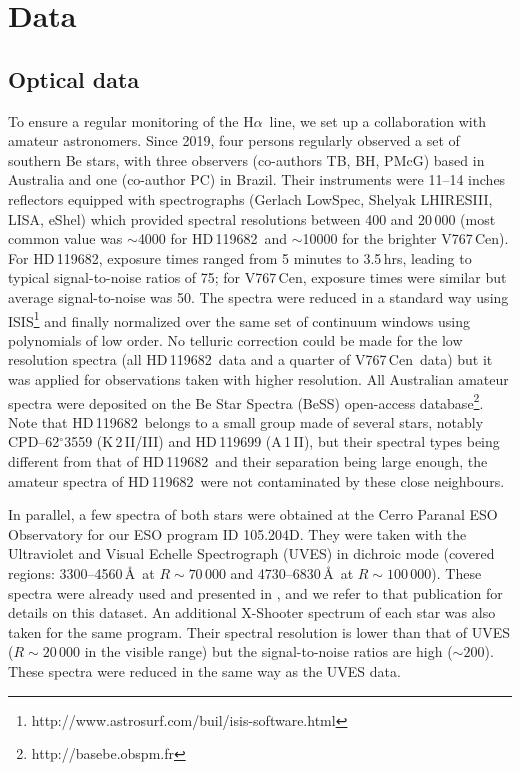 \documentclass[a4paper,fleqn,usenatbib]{mnras}
\newcommand{\hd}{HD\,119682}
\newcommand{\vc}{V767\,Cen}
\newcommand{\ha}{H$\alpha$}
\begin{document}
\section{Data}

\subsection{Optical data}
To ensure a regular monitoring of the \ha\ line, we set up a collaboration with amateur astronomers. Since 2019, four persons regularly observed a set of southern Be stars, with three observers (co-authors TB, BH, PMcG) based in Australia and one (co-author PC) in Brazil. Their instruments were 11--14 inches reflectors equipped with spectrographs (Gerlach LowSpec, Shelyak LHIRESIII, LISA, eShel) which provided spectral resolutions between 400 and 20\,000 (most common value was $\sim$4000 for \hd\ and $\sim$10000 for the brighter \vc). For \hd, exposure times ranged from 5 minutes to 3.5\,hrs, leading to typical signal-to-noise ratios of 75; for \vc, exposure times were similar but average signal-to-noise was 50. The spectra were reduced in a standard way using ISIS\footnote{http://www.astrosurf.com/buil/isis-software.html} and finally normalized over the same set of continuum windows using polynomials of low order. No telluric correction could be made for the low resolution spectra (all \hd\ data and a quarter of \vc\ data) but it was applied for observations taken with higher resolution. All Australian amateur spectra were deposited on the Be Star Spectra (BeSS) open-access database\footnote{http://basebe.obspm.fr}. Note that \hd\ belongs to a small group made of several stars, notably CPD--62$^{\circ}$3559 (K\,2\,II/III) and HD\,119699 (A\,1\,II), but their spectral types being different from that of \hd\ and their separation being large enough, the amateur spectra of \hd\ were not contaminated by these close neighbours.

In parallel, a few spectra of both stars were obtained at the Cerro Paranal ESO Observatory for our ESO program ID 105.204D. They were taken with the Ultraviolet and Visual Echelle Spectrograph (UVES) in dichroic mode (covered regions: 3300--4560\,\AA\ at $R\sim 70\,000$ and 4730--6830\,\AA\ at $R\sim 100\,000$). These spectra were already used and presented in \citet{naz21}, and we refer to that publication for details on this dataset. An additional X-Shooter spectrum of each star was also taken for the same program. Their spectral resolution is lower than that of UVES ($R\sim 20\,000$ in the visible range) but the signal-to-noise ratios are high ($\sim200$). These spectra were reduced in the same way as the UVES data.
\end{document}
